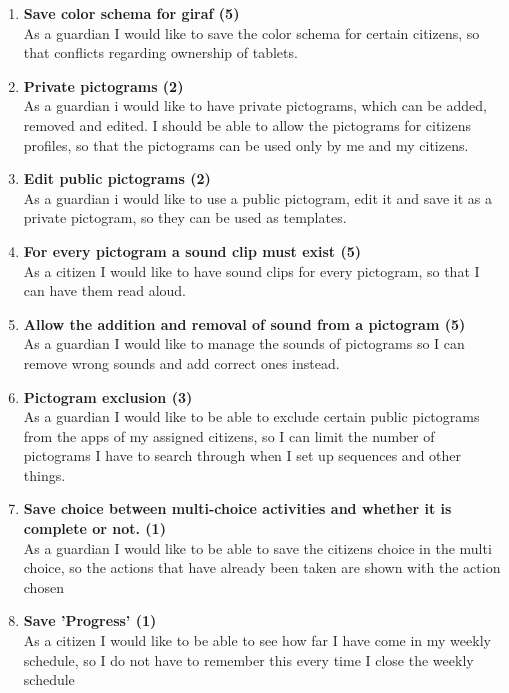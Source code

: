 \begin{enumerate}
	\item \textbf{Save color schema for giraf (5)}\\
	As a guardian I would like to save the color schema for certain citizens, so that conflicts regarding ownership of tablets. 
	
	\item \textbf{Private pictograms (2)}\\
	As a guardian i would like to have private pictograms, which can be added, removed and edited. I should be able to allow the pictograms for citizens profiles, so that the pictograms can be used only by me and my citizens.
	
	\item \textbf{Edit public pictograms (2)}\\
	As a guardian i would like to use a public pictogram, edit it and save it as a private pictogram, so they can be used as templates.
	
	\item \textbf{For every pictogram a sound clip must exist (5)}\\
	As a citizen I would like to have sound clips for every pictogram, so that I can have them read aloud.
	
	\item \textbf{Allow the addition and removal of sound from a pictogram (5)}\\
	As a guardian I would like to manage the sounds of pictograms so I can remove wrong sounds and add correct ones instead.
	
	\item \textbf{Pictogram exclusion (3)}\\
	As a guardian I would like to be able to exclude certain public pictograms from the apps of my assigned citizens, so I can limit the number of pictograms I have to search through when I set up sequences and other things.
	
	\item \textbf{Save choice between multi-choice activities and whether it is complete or not. (1)}\\
	As a guardian I would like to be able to save the citizens choice in the multi choice, so the actions that have already been taken are shown with the action chosen
	
	\item \textbf{Save 'Progress' (1)}\\
	As a citizen I would like to be able to see how far I have come in my weekly schedule, so I do not have to remember this every time I close the weekly schedule
	

\end{enumerate}

